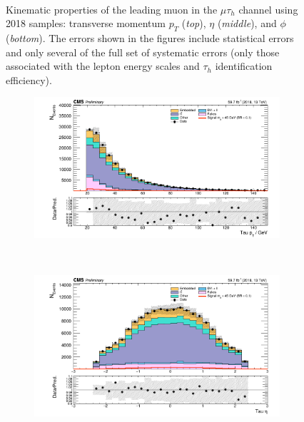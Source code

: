 \begin{figure}[ht]
\begin{subfigure}{0.75\textwidth}
    \end{subfigure} \\ 
    \caption{Kinematic properties of the leading muon in the $\mu\tau_{h}$ channel using 2018 samples: transverse momentum $p_T$ (\textit{top}), $\eta$ (\textit{middle}), and $\phi$ (\textit{bottom}). The errors shown in the figures include statistical errors and only several of the full set of systematic errors (only those associated with the lepton energy scales and $\tau_{h}$ identification efficiency).}
    \label{fig:nanoAOD_mutau_control_plots_leading_muon}
\end{figure}

\begin{figure}[ht]
    \centering
    \begin{subfigure}{0.75\textwidth}
        \includegraphics[width=1.0\textwidth]{figures/ch-11-asymmetric/mutau_pt_2.png}
    \end{subfigure} \\
    \begin{subfigure}{0.75\textwidth}
        \includegraphics[width=1.0\textwidth]{figures/ch-11-asymmetric/mutau_eta_2.png}

\end{subfigure}
\end{figure}

